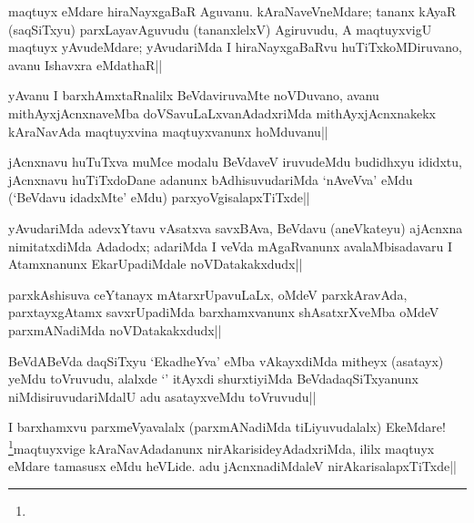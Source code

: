 \begin{artha} 
maqtuyx eMdare hiraNayxgaBaR Aguvanu. kAraNaveVneMdare; tananx kAyaR 
(saqSiTxyu) parxLayavAguvudu (tananxlelxV) Agiruvudu, A maqtuyxvigU 
maqtuyx yAvudeMdare; yAvudariMda I hiraNayxgaBaRvu huTiTxkoMDiruvano, 
avanu Ishavxra eMdathaR||
\end{artha}

\begin{artha} 
yAvanu I barxhAmxtaRnalilx BeVdaviruvaMte noVDuvano, avanu 
mithAyxjAcnxnaveMba doVSavuLaLxvanAdadxriMda mithAyxjAcnxnakekx 
kAraNavAda maqtuyxvina maqtuyxvanunx hoMduvanu||
\end{artha}


\begin{artha} 
jAcnxnavu huTuTxva muMce modalu BeVdaveV iruvudeMdu budidhxyu ididxtu, 
jAcnxnavu huTiTxdoDane adanunx bAdhisuvudariMda `nAveVva' eMdu 
(`BeVdavu idadxMte' eMdu) parxyoVgisalapxTiTxde||
\end{artha}


\begin{artha} 
yAvudariMda adevxYtavu vAsatxva savxBAva, BeVdavu (aneVkateyu) 
ajAcnxna nimitatxdiMda Adadodx; adariMda I veVda mAgaRvanunx 
avalaMbisadavaru I Atamxnanunx EkarUpadiMdale noVDatakakxdudx||
\end{artha}

\begin{artha} 
parxkAshisuva ceYtanayx mAtarxrUpavuLaLx, oMdeV parxkAravAda, 
parxtayxgAtamx savxrUpadiMda barxhamxvanunx shAsatxrXveMba oMdeV 
parxmANadiMda noVDatakakxdudx||
\end{artha}


\begin{artha} 
BeVdABeVda daqSiTxyu `EkadheYva' eMba vAkayxdiMda mitheyx (asatayx) 
yeMdu toVruvudu, alalxde `\stext' itAyxdi shurxtiyiMda 
BeVdadaqSiTxyanunx niMdisiruvudariMdalU adu asatayxveMdu toVruvudu||
\end{artha}


\begin{artha} 
I barxhamxvu parxmeVyavalalx (parxmANadiMda tiLiyuvudalalx) EkeMdare! 
\footnote[1]{}maqtuyxvige kAraNavAdadanunx nirAkarisideyAdadxriMda, 
ililx maqtuyx eMdare tamasusx eMdu heVLide. adu jAcnxnadiMdaleV 
nirAkarisalapxTiTxde||
\end{artha}

